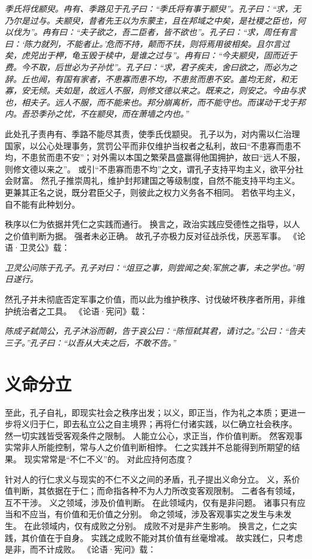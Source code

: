 \documentclass[11pt]{article}
\begin{document}
\textit{季氏将伐颛臾。冉有、季路见于孔子曰：“季氏将有事于颛臾”。孔子曰：“求，无乃尔是过与。夫颛臾，昔者先王以为东蒙主，且在邦域之中矣，是社稷之臣也，何以伐为”。冉有曰：“夫子欲之，吾二臣者，皆不欲也”。孔子曰：“求，周任有言曰：‘陈力就列，不能者止。’危而不持，颠而不扶，则将焉用彼相矣。且尔言过矣，虎兕出于柙，龟玉毁于椟中，是谁之过与”。冉有曰：“今夫颛臾，固而近于费。今不取，后世必为子孙忧”。孔子曰：“求，君子疾夫，舍曰欲之，而必为之辞。丘也闻，有国有家者，不患寡而患不均，不患贫而患不安。盖均无贫，和无寡，安无倾。夫如是，故远人不服，则修文德以来之。既来之，则安之。今由与求也，相夫子。远人不服，而不能来也。邦分崩离析，而不能守也。而谋动干戈于邦内。吾恐季孙之忧，不在颛臾，而在萧墙之内也。”}

此处孔子责冉有、季路不能尽其责，使季氏伐颛臾。
孔子以为，对内需以仁治理国家，以公心处理事务，赏罚公平而非仅维护当权者之私利，故曰“不患寡而患不均，不患贫而患不安”；对外需以本国之繁荣昌盛赢得他国拥护，故曰“远人不服，则修文德以来之”。
或引“不患寡而患不均”之文，谓孔子支持平均主义，欲平分社会财富。
然孔子推崇周礼，维护封邦建国之等级制度，自然不能支持平均主义。
更兼其正名之说，既分君臣父子，则彼此之权力义务各不相同。
若依平均主义，自不能有此种划分。

\par

秩序以仁为依据并凭仁之实践而通行。
换言之，政治实践应受德性之指导，以人之价值判断为据。
强者未必正确。
故孔子亦极力反对征战杀伐，厌恶军事。
《论语·卫灵公》载：

\textit{卫灵公问陈于孔子。孔子对曰：“俎豆之事，则尝闻之矣;军旅之事，未之学也。”明日遂行。}

然孔子并未彻底否定军事之价值，而以此为维护秩序、讨伐破坏秩序者所用，非维护统治者之工具。
《论语·宪问》载：

\textit{陈成子弑简公，孔子沐浴而朝，告于哀公曰：“陈恒弑其君，请讨之。”公曰：“告夫三子。”孔子曰：“以吾从大夫之后，不敢不告。”}

\section{义命分立}
至此，孔子自礼，即现实社会之秩序出发；以义，即正当，作为礼之本质；更进一步将义归于仁，即去私立公之自主境界；再将仁付诸实践，以仁确立社会秩序。
然一切实践皆受客观条件之限制。
人能立公心，求正当，作价值判断。
然客观事实常非人所能控制，常与人之价值判断相悖。
仁之实践并不总能得到所期望的结果。
现实常常是“不仁不义”的。
对此应持何态度？

\par

针对人的行仁求义与现实的不仁不义之间的矛盾，孔子提出义命分立。
义，系价值判断，其依据在于仁；而命指各种不为人力所改变客观限制。
二者各有领域，互不干涉。
义之领域，涉及价值判断。
在此领域内，仅有是非问题。
诸事只有应当和不应当，有价值和无价值之分别。
命之领域，涉及客观事实之发生与未发生。
在此领域内，仅有成败之分别。
成败不对是非产生影响。
换言之，仁之实践，其价值在于自身。
实践之成败不能对其价值有丝毫增减。
故实践仁，只考虑是非，而不计成败。
《论语·宪问》载：
\end{document}
